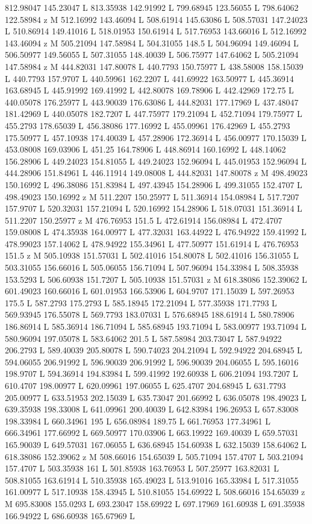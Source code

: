 {\begin{scope}[local bounding box=bb]
{812.98047 145.23047 L 813.35938 142.91992 L 799.68945 123.56055 L 798.64062 122.58984 z M 512.16992 143.46094 L 508.61914 145.63086 L 508.57031 147.24023 L 510.86914 149.41016 L 518.01953 150.61914 L 517.76953 143.66016 L 512.16992 143.46094 z M 505.21094 147.58984 L 504.31055 148.5 L 504.96094 149.46094 L 506.50977 149.56055 L 507.31055 148.40039 L 506.75977 147.64062 L 505.21094 147.58984 z M 444.82031 147.80078 L 440.7793 150.75977 L 438.58008 158.15039 L 440.7793 157.9707 L 440.59961 162.2207 L 441.69922 163.50977 L 445.36914 163.68945 L 445.91992 169.41992 L 442.80078 169.78906 L 442.42969 172.75 L 440.05078 176.25977 L 443.90039 176.63086 L 444.82031 177.17969 L 437.48047 181.42969 L 440.05078 182.7207 L 447.75977 179.21094 L 452.71094 179.75977 L 455.2793 178.65039 L 456.38086 177.16992 L 455.09961 176.42969 L 455.2793 175.50977 L 457.10938 174.40039 L 457.28906 172.36914 L 456.00977 170.15039 L 453.08008 169.03906 L 451.25 164.78906 L 448.86914 160.16992 L 448.14062 156.28906 L 449.24023 154.81055 L 449.24023 152.96094 L 445.01953 152.96094 L 444.28906 151.84961 L 446.11914 149.08008 L 444.82031 147.80078 z M 498.49023 150.16992 L 496.38086 151.83984 L 497.43945 154.28906 L 499.31055 152.4707 L 498.49023 150.16992 z M 511.2207 150.25977 L 511.36914 154.08984 L 517.7207 157.9707 L 520.32031 157.21094 L 520.16992 154.28906 L 518.07031 151.36914 L 511.2207 150.25977 z M 476.76953 151.5 L 472.61914 156.08984 L 472.4707 159.08008 L 474.35938 164.00977 L 477.32031 163.44922 L 476.94922 159.41992 L 478.99023 157.14062 L 478.94922 155.34961 L 477.50977 151.61914 L 476.76953 151.5 z M 505.10938 151.57031 L 502.41016 154.80078 L 502.41016 156.31055 L 503.31055 156.66016 L 505.06055 156.71094 L 507.96094 154.33984 L 508.35938 153.5293 L 506.60938 151.7207 L 505.10938 151.57031 z M 618.38086 152.39062 L 601.49023 160.66016 L 601.01953 166.53906 L 604.9707 171.15039 L 597.26953 175.5 L 587.2793 175.2793 L 585.18945 172.21094 L 577.35938 171.7793 L 569.93945 176.55078 L 569.7793 183.07031 L 576.68945 188.61914 L 580.78906 186.86914 L 585.36914 186.71094 L 585.68945 193.71094 L 583.00977 193.71094 L 580.96094 197.05078 L 583.64062 201.5 L 587.58984 203.73047 L 587.94922 206.2793 L 589.40039 205.80078 L 590.74023 204.21094 L 592.94922 204.68945 L 594.06055 206.91992 L 596.90039 206.91992 L 596.90039 204.06055 L 595.16016 198.9707 L 594.36914 194.83984 L 599.41992 192.60938 L 606.21094 193.7207 L 610.4707 198.00977 L 620.09961 197.06055 L 625.4707 204.68945 L 631.7793 205.00977 L 633.51953 202.15039 L 635.73047 201.66992 L 636.05078 198.49023 L 639.35938 198.33008 L 641.09961 200.40039 L 642.83984 196.26953 L 657.83008 198.33984 L 660.34961 195 L 656.08984 189.75 L 661.76953 177.34961 L 666.34961 177.66992 L 669.50977 170.03906 L 663.19922 169.40039 L 659.57031 165.90039 L 649.57031 167.06055 L 636.68945 154.60938 L 632.15039 158.64062 L 618.38086 152.39062 z M 508.66016 154.65039 L 505.71094 157.4707 L 503.21094 157.4707 L 503.35938 161 L 501.85938 163.76953 L 507.25977 163.82031 L 508.81055 163.61914 L 510.35938 165.49023 L 513.91016 165.33984 L 517.31055 161.00977 L 517.10938 158.43945 L 510.81055 154.69922 L 508.66016 154.65039 z M 695.83008 155.0293 L 693.23047 158.69922 L 697.17969 161.60938 L 691.35938 166.94922 L 686.60938 165.67969 L }
\end{scope}}
